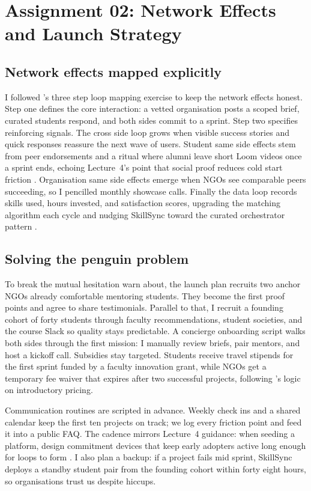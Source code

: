 \section*{Assignment 02: Network Effects and Launch Strategy}

\subsection*{Network effects mapped explicitly}
I followed \citet{Choudary2016}'s three step loop mapping exercise to keep the network effects honest. Step one defines the core interaction: a vetted organisation posts a scoped brief, curated students respond, and both sides commit to a sprint. Step two specifies reinforcing signals. The cross side loop grows when visible success stories and quick responses reassure the next wave of users. Student same side effects stem from peer endorsements and a ritual where alumni leave short Loom videos once a sprint ends, echoing Lecture~4's point that social proof reduces cold start friction \citep{Lecture04}. Organisation same side effects emerge when NGOs see comparable peers succeeding, so I pencilled monthly showcase calls. Finally the data loop records skills used, hours invested, and satisfaction scores, upgrading the matching algorithm each cycle and nudging SkillSync toward the curated orchestrator pattern \citep{Reillier2017}.

\subsection*{Solving the penguin problem}
To break the mutual hesitation \citet{HagiuWright2013} warn about, the launch plan recruits two anchor NGOs already comfortable mentoring students. They become the first proof points and agree to share testimonials. Parallel to that, I recruit a founding cohort of forty students through faculty recommendations, student societies, and the course Slack so quality stays predictable. A concierge onboarding script walks both sides through the first mission: I manually review briefs, pair mentors, and host a kickoff call. Subsidies stay targeted. Students receive travel stipends for the first sprint funded by a faculty innovation grant, while NGOs get a temporary fee waiver that expires after two successful projects, following \citet{FarrellSaloner1986}'s logic on introductory pricing.

Communication routines are scripted in advance. Weekly check ins and a shared calendar keep the first ten projects on track; we log every friction point and feed it into a public FAQ. The cadence mirrors Lecture~4 guidance: when seeding a platform, design commitment devices that keep early adopters active long enough for loops to form \citep{Lecture04}. I also plan a backup: if a project fails mid sprint, SkillSync deploys a standby student pair from the founding cohort within forty eight hours, so organisations trust us despite hiccups.

